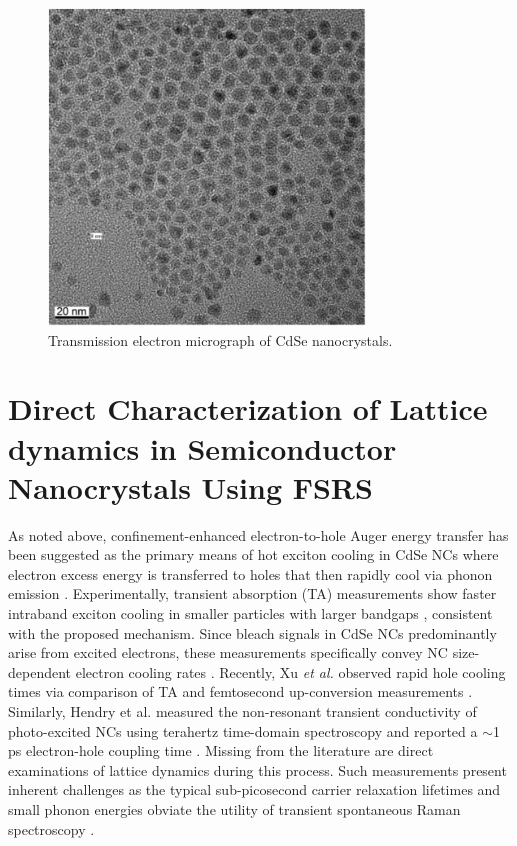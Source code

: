 \begin{figure}
\begin{center}
\includegraphics[width=0.75\textwidth]{./Chapter2/basic2.png}
\caption[Transmission electron micrograph of CdSe NCs.]{Transmission electron micrograph of CdSe nanocrystals.}
\label{f:basic2}
\end{center}
\end{figure}


\section{Direct Characterization of Lattice dynamics in Semiconductor Nanocrystals Using FSRS}

As noted above, confinement-enhanced electron-to-hole Auger energy transfer has been suggested as the primary means of hot exciton cooling in CdSe NCs where electron excess energy is transferred to holes that then rapidly cool via phonon emission \cite{Efros1995281}.  Experimentally, transient absorption (TA) measurements show faster intraband exciton cooling in smaller particles with larger bandgaps \cite{PhysRevB.60.13740, PhysRevB.60.R2181, PhysRevLett.80.4028}, consistent with the proposed mechanism. Since bleach signals in CdSe NCs predominantly arise from excited electrons, these measurements specifically convey NC size-dependent electron cooling rates \cite{Wang23032001, doi:10.1021/ja070099a, doi:10.1021/jp9944132}.  Recently, Xu \emph{et al.} observed rapid hole cooling times via comparison of TA and femtosecond up-conversion measurements \cite{PhysRevB.65.045319}.  Similarly, Hendry et al. measured the non-resonant transient conductivity of photo-excited NCs using terahertz time-domain spectroscopy and reported a $\sim$1 ps electron-hole coupling time \cite{PhysRevLett.96.057408}.  Missing from the literature are direct examinations of lattice dynamics during this process. Such measurements present inherent challenges as the typical sub-picosecond carrier relaxation lifetimes and small phonon energies obviate the utility of transient spontaneous Raman spectroscopy \cite{PhysRevB.80.121403}.  \par

